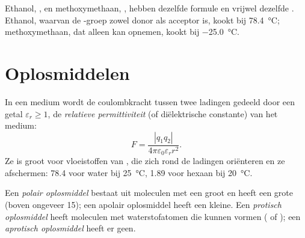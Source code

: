 \begin{example}\label{ex:b1:intermolecular-forces-solvents:isomers}
Ethanol, , en methoxymethaan, , hebben dezelfde
formule  en vrijwel dezelfde . Ethanol,
waarvan de -groep zowel donor als acceptor is, kookt bij
\qty{78.4}{\celsius}; methoxymethaan, dat alleen kan opnemen, kookt bij
\qty{-25.0}{\celsius}.
\end{example}


\section{Oplosmiddelen}

\begin{definition}\label{def:b1:intermolecular-forces-solvents:permittivity}
In een medium wordt de coulombkracht tussen twee ladingen gedeeld door een
getal $\varepsilon_r \ge 1$, de \emph{relatieve permittiviteit}
(of diëlektrische constante) van het medium:
\[
  F = \frac{|q_1 q_2|}{4\pi\varepsilon_0\varepsilon_r r^2} .
\]
Ze is groot voor vloeistoffen van , die zich rond de
ladingen oriënteren en ze afschermen: \num{78.4} voor water bij
\qty{25}{\celsius}, \num{1.89} voor hexaan bij \qty{20}{\celsius}.
\end{definition}


\begin{definition}\label{def:b1:intermolecular-forces-solvents:solvent-classes}
Een \emph{polair oplosmiddel} bestaat uit
moleculen met een groot  en heeft een grote  (boven ongeveer 15); een apolair oplosmiddel heeft een
kleine. Een \emph{protisch oplosmiddel}
heeft moleculen met waterstofatomen die  kunnen vormen
( of ); een \emph{aprotisch
oplosmiddel} heeft er geen.
\end{definition}

